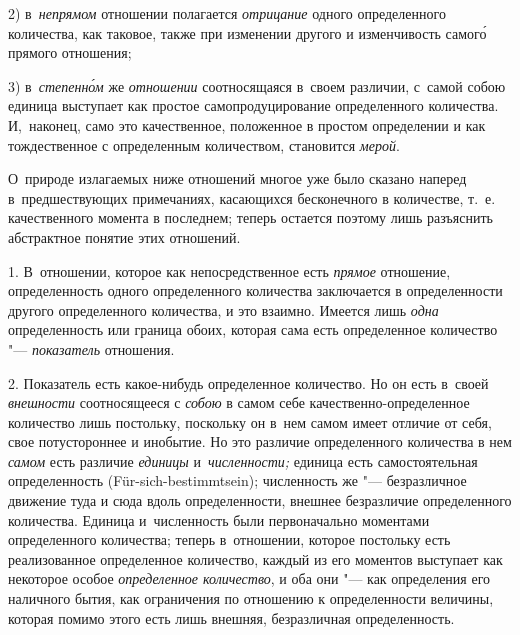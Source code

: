 2) в~{\em непрямом} отношении полагается {\em отрицание} одного определенного
количества, как таковое, также при изменении другого и изменчивость самог\'{о}
прямого отношения;

3) в~{\em степенн\'{о}м} же {\em отношении} соотносящаяся в~своем различии,
с~самой собою единица выступает как простое самопродуцирование определенного
количества. И,~наконец, само это качественное, положенное в простом определении
и как тождественное с определенным количеством, становится {\em мерой}.

О~природе излагаемых ниже отношений многое уже было сказано наперед
в~предшествующих примечаниях, касающихся бесконечного в количестве, т.~е.
качественного момента в последнем; теперь остается поэтому лишь разъяснить
абстрактное понятие этих отношений.


1. В~отношении, которое как непосредственное есть {\em прямое} отношение,
определенность одного определенного количества заключается в определенности
другого определенного количества, и это взаимно. Имеется лишь {\em одна}
определенность или граница обоих, которая сама есть определенное количество
"--- {\em показатель} отношения.

2. Показатель есть какое-нибудь определенное количество. Но он есть в~своей
{\em внешности} соотносящееся с {\em собою} в самом себе
качественно-определенное количество лишь постольку, поскольку он в~нем самом
имеет отличие от себя, свое потустороннее и инобытие. Но это различие
определенного количества в нем {\em самом} есть различие {\em единицы}
и~{\em численности;} единица есть самостоятельная определенность
(Für-sich-bestimmt\-sein); численность же "--- безразличное движение туда и
сюда вдоль определенности, внешнее безразличие определенного количества.
Единица и~численность были первоначально моментами определенного количества;
теперь в~отношении, которое постольку есть реализованное определенное
количество, каждый из его моментов выступает как некоторое особое
{\em определенное количество}, и оба они "--- как определения его наличного
бытия, как ограничения по отношению к определенности величины, которая помимо
этого есть лишь внешняя, безразличная определенность.

